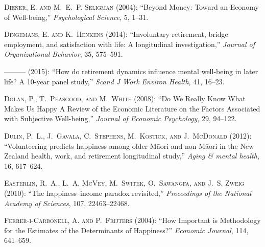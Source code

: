 \documentclass[10pt, letterpaper]{article}
\begin{document}
\begin{spacing}{1.4}
\begin{thebibliography}{91}
\textsc{Diener, E. and M.~E.~P. Seligman} (2004): \enquote{Beyond Money: Toward
  an Economy of Well-being,} \emph{Psychological Science}, 5, 1--31.

\textsc{Dingemans, E. and K.~Henkens} (2014): \enquote{Involuntary retirement,
  bridge employment, and satisfaction with life: A longitudinal investigation,}
  \emph{Journal of Organizational Behavior}, 35, 575--591.

---\hspace{-.1pt}---\hspace{-.1pt}--- (2015): \enquote{How do retirement
  dynamics influence mental well-being in later life? A 10-year panel study,}
  \emph{Scand J Work Environ Health}, 41, 16--23.

\textsc{Dolan, P., T.~Peasgood, and M.~White} (2008): \enquote{Do We Really
  Know What Makes Us Happy A Review of the Economic Literature on the Factors
  Associated with Subjective Well-being,} \emph{Journal of Economic
  Psychology}, 29, 94--122.

\textsc{Dulin, P.~L., J.~Gavala, C.~Stephens, M.~Kostick, and J.~McDonald}
  (2012): \enquote{Volunteering predicts happiness among older M{\=a}ori and
  non-M{\=a}ori in the New Zealand health, work, and retirement longitudinal
  study,} \emph{Aging \& mental health}, 16, 617--624.

\textsc{Easterlin, R.~A., L.~A. McVey, M.~Switek, O.~Sawangfa, and J.~S. Zweig}
  (2010): \enquote{The happiness--income paradox revisited,} \emph{Proceedings
  of the National Academy of Sciences}, 107, 22463--22468.

\textsc{{Ferrer-i-Carbonell}, A. and P.~Frijters} (2004): \enquote{How
  Important is Methodology for the Estimates of the Determinants of Happiness?}
  \emph{Economic Journal}, 114, 641--659.


\end{thebibliography}
\end{spacing}
\end{document}

